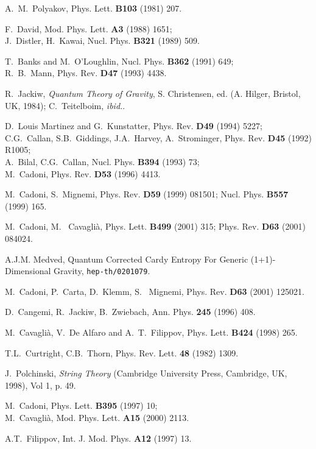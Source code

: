 \documentclass[a4paper,aps,prd,twocolumn,groupedaddress]{revtex4}
\begin{document}
\begin{thebibliography}{99}
 A.~M.~Polyakov, Phys. Lett. {\bf B103} (1981) 207.

 F.~David, Mod. Phys. Lett. {\bf A3} (1988) 1651;\\
J.~Distler, H.~Kawai, Nucl. Phys. {\bf B321} (1989) 509.

 T.~Banks and M.~O'Loughlin,
 Nucl. Phys. {\bf B362} (1991) 649;\\
 R.~B.~Mann, Phys. Rev. {\bf D47} (1993) 4438.

 R.~Jackiw, \emph{Quantum Theory of
Gravity}, S. Christensen, ed. (A. Hilger, Bristol, UK, 1984);
C.~Teitelboim, {\it ibid.}.

 D.~Louis Martinez and G.~Kunstatter, Phys. Rev. {\bf
D49} (1994) 5227;\\ 
C.G.~Callan, S.B.~Giddings, J.A.~Harvey,
A.~Strominger, Phys. Rev. {\bf D45} (1992) R1005;\\ 
A.~Bilal,
C.G.~Callan, Nucl. Phys. \textbf{B394} (1993) 73;\\ 
M.~Cadoni,
Phys. Rev. {\bf D53} (1996) 4413.

M.~Cadoni, S.~Mignemi, Phys. Rev. {\bf D59} (1999) 081501;
Nucl. Phys. {\bf B557} (1999) 165.

M.~Cadoni, M.~ Cavagli\`a,  Phys. Lett. {\bf B499} (2001) 315;
Phys. Rev. {\bf D63} (2001) 084024.

 A.J.M. Medved, Quantum Corrected Cardy Entropy For
Generic (1+1)-Dimensional Gravity, \texttt{hep-th/0201079}.


 M.~Cadoni, P.~Carta, D.~Klemm, S.~ Mignemi,
Phys. Rev. {\bf D63} (2001) 125021.

 D.~Cangemi, R.~Jackiw, B.~Zwiebach, Ann. Phys. 
{\bf 245} (1996) 408.


M.~Cavagli\`a, V.~De Alfaro and A.~T.~Filippov,
Phys. Lett. {\bf B424} (1998) 265.


 T.L.~Curtright, C.B.~Thorn,
Phys. Rev. Lett. \textbf{48} (1982) 1309.

 J.~Polchinski, \emph{String Theory} (Cambridge
University Press, Cambridge, UK, 1998), Vol 1, p. 49.


 M.~Cadoni, Phys. Lett. {\bf B395} (1997) 10;\\ 
M.~Cavagli\`a, Mod. Phys. Lett. {\bf A15} (2000) 2113.

 A.T.~Filippov, Int. J. Mod. Phys. {\bf A12} (1997) 13.


\end{thebibliography}
\end{document}
